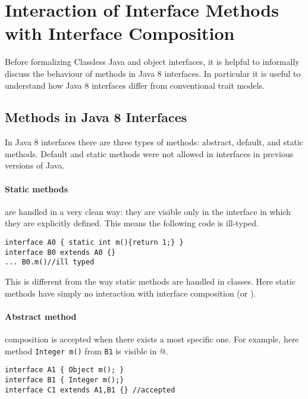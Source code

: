 \section{Interaction of Interface Methods with Interface Composition}
Before formalizing Classless Java and object interfaces, it is helpful
to informally discuss the behaviour of methods in Java 8
interfaces. In particular it is useful to understand how Java 8
interfaces differ from conventional trait models.


\subsection{Methods in Java 8 Interfaces}
In Java 8 interfaces there are three types of methods: abstract, default, and static methods. Default and static methods were not allowed in interfaces in previous versions of Java.

\paragraph{Static methods} are handled in a very clean way: they are visible only in
  the interface in which they are explicitly defined. This means the following code
  is ill-typed.
\begin{lstlisting}
interface A0 { static int m(){return 1;} }
interface B0 extends A0 {}
... B0.m()//ill typed
\end{lstlisting}
This is different from the way static methods are handled in classes. Here
static methods have simply no interaction with interface
composition (\Q@extends@ or \Q@implements@).

\paragraph{Abstract method} composition is accepted when there exists a most specific one.
  For example, here method \texttt{Integer m()} from \texttt{B1} is visible in @.
\begin{lstlisting}
interface A1 { Object m(); }
interface B1 { Integer m();}
interface C1 extends A1,B1 {} //accepted
\end{lstlisting}

